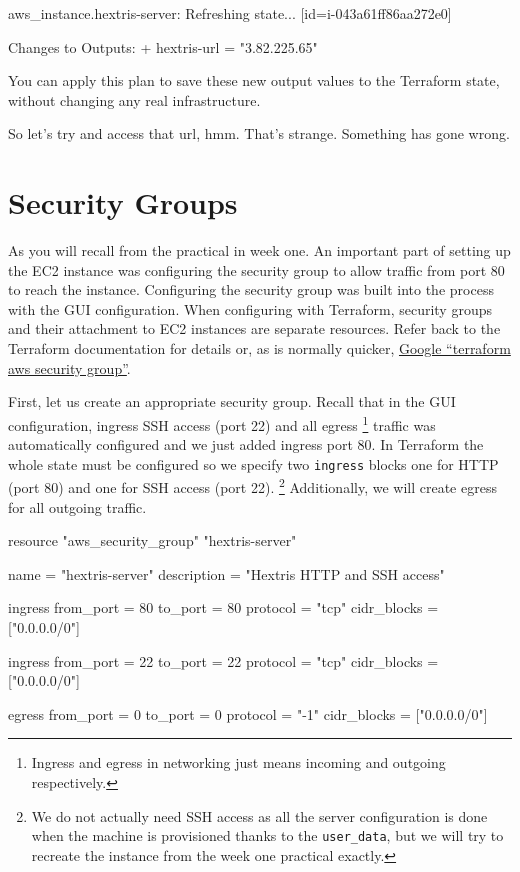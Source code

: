 \documentclass{csse4400}
\begin{document}
\begin{code}[language=terraform-plan]{}
aws_instance.hextris-server: Refreshing state... [id=i-043a61ff86aa272e0]

Changes to Outputs:
  + hextris-url = "3.82.225.65"
\end{code}

You can apply this plan to save these new output values to the Terraform state, without changing any real infrastructure.  

So let's try and access that url, hmm.
That's strange. Something has gone wrong.

\section{Security Groups}
As you will recall from the practical in week one.
An important part of setting up the EC2 instance was configuring the security group to allow traffic from port 80 to reach the instance.
Configuring the security group was built into the process with the GUI configuration.
When configuring with Terraform, security groups and their attachment to EC2 instances are separate resources.
Refer back to the Terraform documentation for details or,
as is normally quicker, \href{https://www.google.com/search?q=terraform+aws+security+group}{Google ``terraform aws security group''}.

First, let us create an appropriate security group.
Recall that in the GUI configuration,
ingress SSH access (port 22) and all egress%
\footnote{Ingress and egress in networking just means incoming and outgoing respectively.}
traffic was automatically configured and we just added ingress port 80.
In Terraform the whole state must be configured so we specify two
\texttt{ingress} blocks one for HTTP (port 80) and one for SSH access (port 22).%
\footnote{We do not actually need SSH access as all the server configuration is done when the machine is provisioned thanks to the \texttt{user\_data},
but we will try to recreate the instance from the week one practical exactly.}
Additionally, we will create egress for all outgoing traffic.

\begin{code}[language=terraform]{}
resource "aws_security_group" "hextris-server" {
  name = "hextris-server"
  description = "Hextris HTTP and SSH access"

  ingress {
    from_port = 80
    to_port = 80
    protocol = "tcp"
    cidr_blocks = ["0.0.0.0/0"]
  }

  ingress {
    from_port = 22
    to_port = 22
    protocol = "tcp"
    cidr_blocks = ["0.0.0.0/0"]
  }

  egress {
    from_port = 0
    to_port = 0
    protocol = "-1"
    cidr_blocks = ["0.0.0.0/0"]
  }
}
\end{code}
\end{document}
